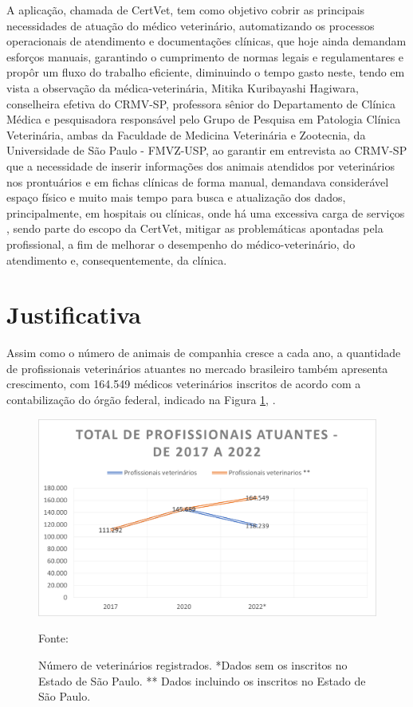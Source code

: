 \documentclass[
    12pt,               %
    openright,          %
    oneside,
    a4paper,            %
    BIBLATEX,           %
    TODO,               %
    english,            %
    brazil              %
    ]{ifsp-spo-inf-ctds}
\begin{document}
    A aplicação, chamada de CertVet, tem como objetivo cobrir as principais necessidades de atuação do médico veterinário, automatizando os processos operacionais de atendimento e documentações clínicas, que hoje ainda demandam esforços manuais, garantindo o cumprimento de normas legais e regulamentares e propôr um fluxo do trabalho eficiente, diminuindo o tempo gasto neste, tendo em vista a observação da médica-veterinária, Mitika Kuribayashi Hagiwara, conselheira efetiva do CRMV-SP, professora sênior do Departamento de Clínica Médica e pesquisadora responsável pelo Grupo de Pesquisa em Patologia Clínica Veterinária, ambas da Faculdade de Medicina Veterinária e Zootecnia, da Universidade de São Paulo - FMVZ-USP, ao garantir em entrevista ao CRMV-SP que a necessidade de inserir informações dos animais atendidos por veterinários nos prontuários e em fichas clínicas de forma manual, demandava considerável espaço físico e muito mais tempo para busca e atualização dos dados, principalmente, em hospitais ou clínicas, onde há uma excessiva carga de serviços \cite{mitika}, sendo parte do escopo da CertVet, mitigar as problemáticas apontadas pela profissional, a fim de melhorar o desempenho do médico-veterinário, do atendimento e, consequentemente, da clínica.


    \section{Justificativa}\label{justificativa}

    Assim como o número de animais de companhia cresce a cada ano, a quantidade de profissionais veterinários atuantes no mercado brasileiro também apresenta crescimento, com 164.549 médicos veterinários inscritos de acordo com a contabilização do órgão federal, indicado na Figura \ref{fig:grafico vet}, .

    \begin{figure}[H]
        \centering
        \includegraphics{images/grafico_profissionais.png}
        \caption{Número de veterinários registrados. *Dados sem os inscritos no Estado de São Paulo. ** Dados incluindo os inscritos no Estado de São Paulo.}
        \footnotesize {Fonte:  }
        \label{fig:grafico vet}
    \end{figure}
\end{document}
